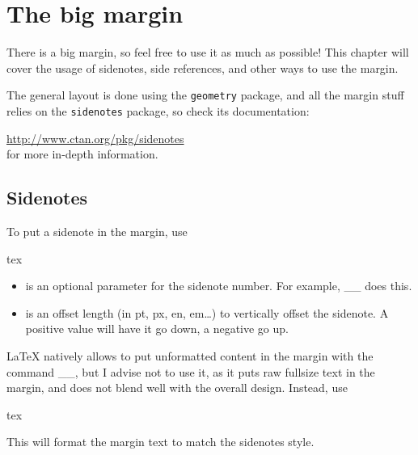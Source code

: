 \documentclass[
    11pt,
]{tufte-style-thesis}
\begin{document}
\section{The big margin}

There is a big margin, so feel free to use it as much as possible! This chapter will cover the usage of sidenotes, side references, and other ways to use the margin.

The general layout is done using the \texttt{geometry} package, and all the margin stuff relies on the \texttt{sidenotes} package, so check its documentation:

\centering\url{http://www.ctan.org/pkg/sidenotes}\\
\RaggedRight\noindent for more in-depth information.

\subsection{Sidenotes}

To put a sidenote in the margin, use
\begin{codebox}{tex}
\end{codebox}
\begin{itemize}
\item
{} is an optional parameter for the sidenote number. For example, __ does this.
\item
{} is an offset length (in pt, px, en, em\dots) to vertically offset the sidenote. A positive value will have it go down, a negative go up.
\end{itemize}

\LaTeX{} natively allows to put unformatted content in the margin with the command __, but I advise not to use it, as it puts raw fullsize text in the margin, and does not blend well with the overall design. Instead, use
\begin{codebox}{tex}
\end{codebox}
This will format the margin text to match the sidenotes style.
\end{document}
